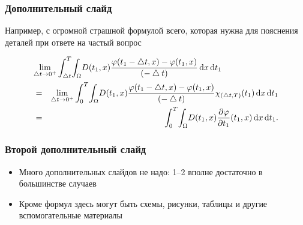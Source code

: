 \documentclass{beamer}
\begin{document}
\appendix

\begin{frame}
  \frametitle{Дополнительный слайд}
  Например, с огромной страшной формулой всего, которая нужна для пояснения деталей при ответе на частый вопрос

  \begin{eqnarray*}
    \lefteqn{
      \lim_{\bigtriangleup t \to 0^+}\int_{\bigtriangleup t}^{T} \! \int_{\Omega} \! D(t_1,x) \frac{\varphi(t_1-\bigtriangleup t,x)-\varphi(t_1,x)}{(-\bigtriangleup t)} \, \mathrm{d}x \, \mathrm{d}t_1
    }\\
    &=&\lim_{\bigtriangleup t \to 0^+} \int_{0}^{T} \! \int_{\Omega} \! D(t_1,x) \frac{\varphi(t_1-\bigtriangleup t,x)-\varphi(t_1,x)}{(-\bigtriangleup t)} \chi_{(\bigtriangleup t,T)}(t_1) \, \mathrm{d}x \, \mathrm{d}t_1
    \\
    &= &\int_{0}^{T} \! \int_{\Omega} \! D(t_1,x) \frac{\partial \varphi}{\partial t_1} (t_1,x) \, \mathrm{d}x \, \mathrm{d}t_1 .
  \end{eqnarray*}
\end{frame}

\begin{frame}
  \frametitle{Второй дополнительный слайд}
  \begin{itemize}
    \item Много дополнительных слайдов не надо: 1--2 вполне достаточно в большинстве случаев
    \item Кроме формул здесь могут быть схемы, рисунки, таблицы и другие вспомогательные материалы
  \end{itemize}


\end{frame}
\end{document}
